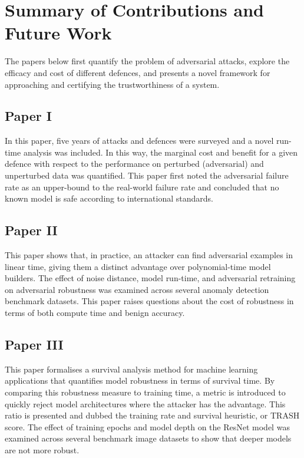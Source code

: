 \chapter{Summary of Contributions and Future Work}
\label{ch:summary}
The papers below first quantify the problem of adversarial attacks, explore the efficacy and cost of different defences, and presents a novel framework for approaching and certifying the trustworthiness of a system.
\section{Paper I}
\paperI

\vspace{1em}
\noindent{}
In this paper, five years of attacks and defences were surveyed and a novel run-time analysis was included. 
In this way, the marginal cost and benefit for a given defence with respect to the performance on perturbed (adversarial) and unperturbed data was quantified. 
This paper first noted the adversarial failure rate as an upper-bound to the real-world failure rate and concluded that no known model is safe according to international standards.

\section{Paper II}
\paperII

\vspace{1em}
\noindent{}
This paper shows that, in practice, an attacker can find adversarial examples in linear time, giving them a distinct advantage over polynomial-time model builders. 
The effect of noise distance, model run-time, and adversarial retraining on adversarial robustness was examined across several anomaly detection benchmark datasets.
This paper raises questions about the cost of robustness in terms of both compute time and benign accuracy.

\section{Paper III}
\paperIII

\vspace{1em}
\noindent{}

This paper formalises a survival analysis method for machine learning applications that quantifies model robustness in terms of survival time. 
By comparing this robustness measure to training time, a metric is introduced to quickly reject model architectures where the attacker has the advantage.
This ratio is presented and dubbed the training rate and survival heuristic, or TRASH score. 
The effect of training epochs and model depth on the ResNet model was examined across several benchmark image datasets to show that deeper models are not more robust.

